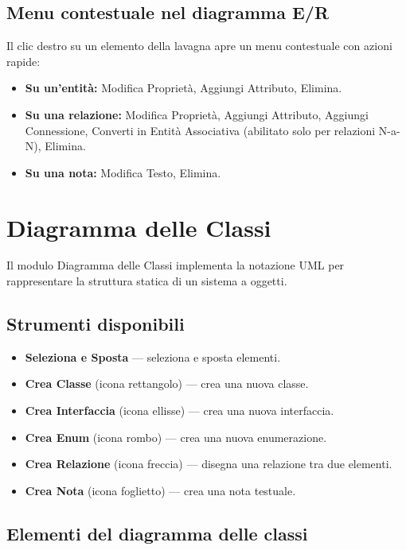 \documentclass[a4paper,11pt]{article}
\newcommand{\uielement}[1]{\textbf{#1}}
\begin{document}
\subsection{Menu contestuale nel diagramma E/R}

Il clic destro su un elemento della lavagna apre un menu contestuale con azioni rapide:

\begin{itemize}
  \item \textbf{Su un'entità:} Modifica Proprietà, Aggiungi Attributo, Elimina.
  \item \textbf{Su una relazione:} Modifica Proprietà, Aggiungi Attributo, Aggiungi Connessione,
        Converti in Entità Associativa (abilitato solo per relazioni N-a-N), Elimina.
  \item \textbf{Su una nota:} Modifica Testo, Elimina.
\end{itemize}

\section{Diagramma delle Classi}
\label{sec:class}

Il modulo Diagramma delle Classi implementa la notazione UML per rappresentare la struttura
statica di un sistema a oggetti.

\subsection{Strumenti disponibili}

\begin{itemize}
  \item \uielement{Seleziona e Sposta} --- seleziona e sposta elementi.
  \item \uielement{Crea Classe} (icona rettangolo) --- crea una nuova classe.
  \item \uielement{Crea Interfaccia} (icona ellisse) --- crea una nuova interfaccia.
  \item \uielement{Crea Enum} (icona rombo) --- crea una nuova enumerazione.
  \item \uielement{Crea Relazione} (icona freccia) --- disegna una relazione tra due elementi.
  \item \uielement{Crea Nota} (icona foglietto) --- crea una nota testuale.
\end{itemize}

\subsection{Elementi del diagramma delle classi}
\end{document}
